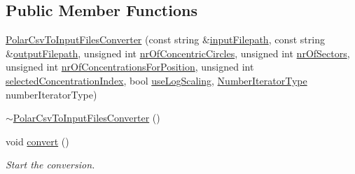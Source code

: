 \subsection*{Public Member Functions}
\begin{DoxyCompactItemize}
\item 
\hyperlink{classmultiscale_1_1video_1_1PolarCsvToInputFilesConverter_a4e3b77194b9706370e25b7eeba416cda}{Polar\-Csv\-To\-Input\-Files\-Converter} (const string \&\hyperlink{classmultiscale_1_1video_1_1PolarCsvToInputFilesConverter_a7b33b6d00b5e0d809f4fb0d76985ab59}{input\-Filepath}, const string \&\hyperlink{classmultiscale_1_1video_1_1PolarCsvToInputFilesConverter_a1033d31c9bfc7ccad08337c7b0fa6e6e}{output\-Filepath}, unsigned int \hyperlink{classmultiscale_1_1video_1_1PolarCsvToInputFilesConverter_a7aa37d18880e822369cbe118a093e24f}{nr\-Of\-Concentric\-Circles}, unsigned int \hyperlink{classmultiscale_1_1video_1_1PolarCsvToInputFilesConverter_a9246a2c9749602af145d5579bde8a9d1}{nr\-Of\-Sectors}, unsigned int \hyperlink{classmultiscale_1_1video_1_1PolarCsvToInputFilesConverter_a3a9301788514c50c295ca113a4114938}{nr\-Of\-Concentrations\-For\-Position}, unsigned int \hyperlink{classmultiscale_1_1video_1_1PolarCsvToInputFilesConverter_a121d592659f9f5075c8c78aa46c2950c}{selected\-Concentration\-Index}, bool \hyperlink{classmultiscale_1_1video_1_1PolarCsvToInputFilesConverter_af07bf56fc39bb226a6e2596f35ada0d7}{use\-Log\-Scaling}, \hyperlink{namespacemultiscale_a6ef911f4d48a4bf5e657c237ec169ff5}{Number\-Iterator\-Type} number\-Iterator\-Type)
\item 
\hyperlink{classmultiscale_1_1video_1_1PolarCsvToInputFilesConverter_afdd156ae24d5d6194b113dd661110ed5}{$\sim$\-Polar\-Csv\-To\-Input\-Files\-Converter} ()
\item 
void \hyperlink{classmultiscale_1_1video_1_1PolarCsvToInputFilesConverter_a818c188569ad54cb0cfbbaa2bd32356c}{convert} ()
\begin{DoxyCompactList}\small\item\em Start the conversion. \end{DoxyCompactList}\end{DoxyCompactItemize}

